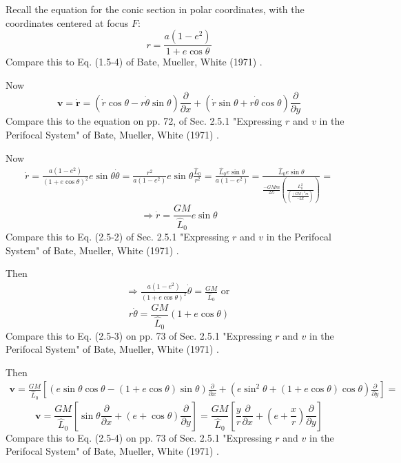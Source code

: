 \documentclass[10pt]{amsart}
\begin{document}
\begin{multicols*}{2}
Recall the equation for the conic section in polar coordinates, with the coordinates centered at focus $F$:
\begin{equation}
r = \frac{a(1-e^2) }{ 1 + e\cos{\theta}}
\end{equation}
Compare this to Eq. (1.5-4) of Bate, Mueller, White (1971) \cite{BMW1971}.

Now
\begin{equation}
\mathbf{v} = \dot{\mathbf{r}} = (\dot{r} \cos{\theta} - r\dot{\theta} \sin{\theta}) \frac{\partial}{\partial x} + (\dot{r}\sin{\theta} + r\dot{\theta}\cos{\theta}) \frac{\partial }{ \partial y}
\end{equation}
Compare this to the equation on pp. 72, of Sec. 2.5.1 "Expressing $r$ and $v$ in the Perifocal System" of Bate, Mueller, White (1971) \cite{BMW1971}.

Now
\[
\begin{gathered}
\dot{r} = \frac{ a ( 1 - e^2) }{ (1+ e\cos{\theta})^2 } e\sin{\theta} \dot{\theta} = \frac{r^2}{a (1-e^2) } e\sin{\theta} \frac{ \widehat{L}_0 }{ r^2} = \frac{ \widehat{L}_0 e\sin{\theta}}{ a(1-e^2)} = \frac{\widehat{L}_0 e\sin{\theta} }{ \frac{ -GMm}{2E} \left( \frac{ L_0^2}{ \left( \frac{(GM)^2 m }{ -2E} \right) } \right) } = 
\end{gathered}
\]
\begin{equation}
\Longrightarrow \dot{r} = \frac{GM}{\widehat{L}_0} e\sin{\theta}
\end{equation}
Compare this to Eq. (2.5-2) of Sec. 2.5.1 "Expressing $r$ and $v$ in the Perifocal System" of Bate, Mueller, White (1971) \cite{BMW1971}.

Then
\[
\begin{gathered}
	\Longrightarrow \frac{ a (1-e^2) }{ (1 + e\cos{\theta})^2 } \dot{\theta} = \frac{GM}{ \widehat{L}_0 } \text{ or } 
\end{gathered}
\]
\begin{equation}
r\dot{\theta} = \frac{GM}{\widehat{L}_0 } (1 + e\cos{\theta})
\end{equation}
Compare this to Eq. (2.5-3) on pp. 73 of Sec. 2.5.1 "Expressing $r$ and $v$ in the Perifocal System" of Bate, Mueller, White (1971) \cite{BMW1971}.

Then
\[
\begin{gathered}
\mathbf{v} = \frac{GM}{\widehat{L}_0} \left[ \left( e \sin{\theta} \cos{\theta} - (1 + e\cos{\theta}) \sin{\theta} \right) \frac{\partial }{ \partial x} + \left( e\sin^2{\theta} + (1 + e\cos{\theta} ) \cos{\theta} \right) \frac{\partial }{ \partial y} \right] = 
\end{gathered}
\]
\begin{equation}
\mathbf{v} = \frac{GM}{ \widehat{L}_0} \left[ \sin{\theta} \frac{\partial}{\partial x} + (e + \cos{\theta}) \frac{\partial }{\partial y} \right] = \frac{GM}{ \widehat{L}_0} \left[ \frac{y}{r} \frac{\partial}{\partial x} + (e + \frac{x}{r}) \frac{\partial }{\partial y} \right]
\end{equation}
Compare this to Eq. (2.5-4) on pp. 73 of Sec. 2.5.1 "Expressing $r$ and $v$ in the Perifocal System" of Bate, Mueller, White (1971) \cite{BMW1971}.


\end{multicols*}
\end{document}
